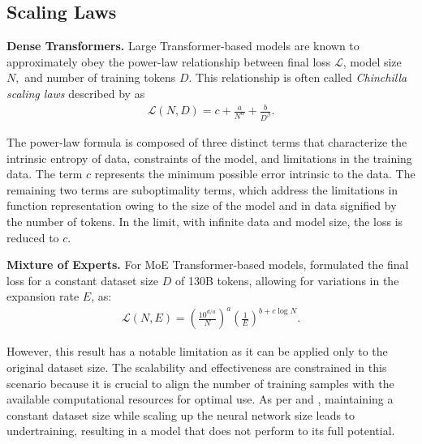 \newpage
\subsection{Scaling Laws}
\label{sec:back_scaling}

\textbf{Dense Transformers.} Large Transformer-based models are known to approximately obey the power-law relationship between final loss $\mathcal{L}$, model size $N,$ and number of training tokens $D.$ This relationship is often called {\it Chinchilla scaling laws} described by \cite{hoffmann2022training} as
\begin{align}\label{eq:chinchilla}
    \mathcal{L}(N, D) = c + \frac{a}{N^\alpha} + \frac{b}{D^\beta}. 
\end{align}


The power-law formula is composed of three distinct terms that characterize the intrinsic entropy of data, constraints of the model, and limitations in the training data. The term $c$ represents the minimum possible error intrinsic to the data. The remaining two terms are suboptimality terms, which address the limitations in function representation owing to the size of the model and in data signified by the number of tokens. In the limit, with infinite data and model size, the loss is reduced to $c$.



\textbf{Mixture of Experts.}  For MoE Transformer-based models, \cite{clark2022unified} formulated the final loss for a constant dataset size \( D \) of 130B tokens, allowing for variations in the expansion rate \( E \), as: 
\begin{align}\label{eq:scaling_law}
    \mathcal{L}(N, E) = \left( \frac{10^{d/a}}{N}\right)^a \left( \frac{1}{E}\right)^{b+c\log{N}}.
\end{align}

However, this result has a notable limitation as it can be applied only to the original dataset size. The scalability and effectiveness are constrained in this scenario because it is crucial to align the number of training samples with the available computational resources for optimal use. As per \cite{kaplan2020scaling} and \cite{hoffmann2022training}, maintaining a constant dataset size while scaling up the neural network size leads to undertraining, resulting in a model that does not perform to its full potential.


